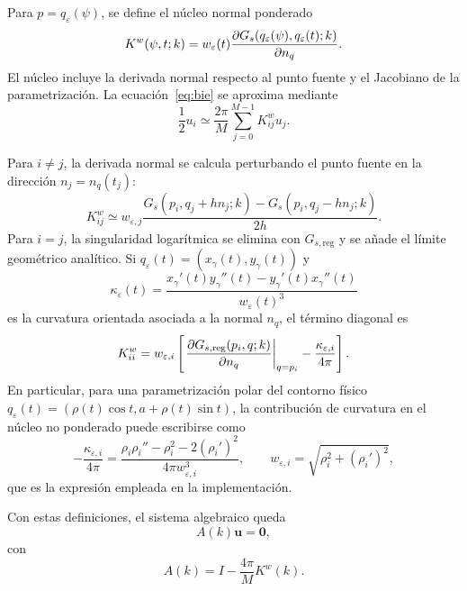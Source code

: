 \documentclass[11pt]{article}
\begin{document}
Para \(p=q_\varepsilon(\psi)\), se define el núcleo normal ponderado
\begin{equation}
K^{w}(\psi,t;k)
=
w_\varepsilon(t)
\pdv{G_s\!\left(q_\varepsilon(\psi),q_\varepsilon(t);k\right)}{n_q}.
\label{eq:weighted_green_kernel}
\end{equation}
El núcleo incluye la derivada normal respecto al punto fuente y el Jacobiano
de la parametrización. La ecuación~\eqref{eq:bie} se aproxima mediante
\begin{equation}
\frac12u_i
\simeq
\frac{2\pi}{M}
\sum_{j=0}^{M-1}
K^w_{ij}u_j.
\label{eq:midpoint_collocation}
\end{equation}

Para \(i\neq j\), la derivada normal se calcula perturbando el punto fuente en la dirección
\(n_j=n_q(t_j)\):
\begin{equation}
K^w_{ij}
\simeq
w_{\varepsilon,j}
\frac{
G_s(p_i,q_j+h n_j;k)
-G_s(p_i,q_j-h n_j;k)
}{2h}.
\label{eq:centered_normal_derivative}
\end{equation}
Para \(i=j\), la singularidad logarítmica se elimina con
\(G_{s,\mathrm{reg}}\) y se añade el límite geométrico analítico. Si
\(q_\varepsilon(t)=(x_\gamma(t),y_\gamma(t))\) y
\begin{equation}
\kappa_\varepsilon(t)
=
\frac{x_\gamma'(t)y_\gamma''(t)-y_\gamma'(t)x_\gamma''(t)}{w_\varepsilon(t)^3}
\end{equation}
es la curvatura orientada asociada a la normal \(n_q\), el término diagonal es
\begin{equation}
K^w_{ii}
=
w_{\varepsilon,i}
\left[
\left.
\pdv{G_{s,\mathrm{reg}}(p_i,q;k)}{n_q}
\right|_{q=p_i}
-
\frac{\kappa_{\varepsilon,i}}{4\pi}
\right].
\label{eq:diagonal_weighted_kernel}
\end{equation}
En particular, para una parametrización polar del contorno físico
\(q_\varepsilon(t)=(\rho(t)\cos t,a+\rho(t)\sin t)\), la contribución de curvatura en el núcleo
no ponderado puede escribirse como
\begin{equation}
-\frac{\kappa_{\varepsilon,i}}{4\pi}
=
\frac{
\rho_i\rho_i''-\rho_i^2-2(\rho_i')^2
}{4\pi w_{\varepsilon,i}^3},
\qquad
w_{\varepsilon,i}=\sqrt{\rho_i^2+(\rho_i')^2},
\label{eq:polar_curvature_term}
\end{equation}
que es la expresión empleada en la implementación.

Con estas definiciones, el sistema algebraico queda
\begin{equation}
A(k)\mathbf{u}=\mathbf{0},
\end{equation}
con
\begin{equation}
A(k)
=
I-\frac{4\pi}{M}K^w(k).
\label{eq:bem_matrix}
\end{equation}
\end{document}
